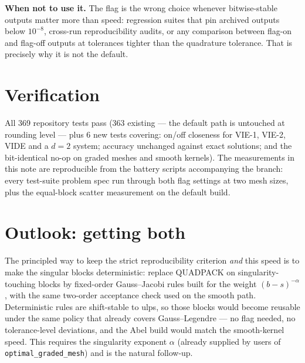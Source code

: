 \documentclass[11pt]{article}
\begin{document}
\noindent\textbf{When not to use it.} The flag is the wrong choice
whenever bitwise-stable outputs matter more than speed: regression
suites that pin archived outputs below $10^{-8}$, cross-run
reproducibility audits, or any comparison between flag-on and flag-off
outputs at tolerances tighter than the quadrature tolerance. That is
precisely why it is not the default.

\section{Verification}

All 369 repository tests pass (363 existing --- the default path is
untouched at rounding level --- plus 6 new tests covering: on/off
closeness for VIE-1, VIE-2, VIDE and a $d=2$ system; accuracy
unchanged against exact solutions; and the bit-identical no-op on
graded meshes and smooth kernels). The measurements in this note are
reproducible from the battery scripts accompanying the branch: every
test-suite problem spec run through both flag settings at two mesh
sizes, plus the equal-block scatter measurement on the default build.

\section{Outlook: getting both}

The principled way to keep the strict reproducibility criterion
\emph{and} this speed is to make the singular blocks deterministic:
replace QUADPACK on singularity-touching blocks by fixed-order
Gauss--Jacobi rules built for the weight $(b-s)^{-\alpha}$, with the
same two-order acceptance check used on the smooth path. Deterministic
rules are shift-stable to ulps, so those blocks would become reusable
under the same policy that already covers Gauss--Legendre --- no flag
needed, no tolerance-level deviations, and the Abel build would match
the smooth-kernel speed. This requires the singularity exponent
$\alpha$ (already supplied by users of \texttt{optimal\_graded\_mesh})
and is the natural follow-up.
\end{document}
